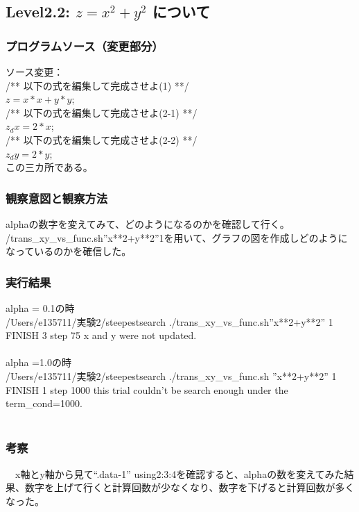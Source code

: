 \subsection{Level2.2: $z=x^2 + y^2$ について}
\subsubsection{プログラムソース（変更部分）}
ソース変更：\\
/** 以下の式を編集して完成させよ(1) **/\\
 $ z = x*x + y*y$;\\
/** 以下の式を編集して完成させよ(2-1) **/\\
$z_dx = 2*x$;\\
/** 以下の式を編集して完成させよ(2-2) **/\\
$z_dy = 2*y$;\\
この三カ所である。\\
\subsubsection{観察意図と観察方法}
alphaの数字を変えてみて、どのようになるのかを確認して行く。\\
/trans\_xy\_vs\_func.sh''x**2+y**2''1を用いて、グラフの図を作成しどのようになっているのかを確信した。\\
\subsubsection{実行結果}
alpha = 0.1の時\\
/Users/e135711/実験2/steepestsearch ./trans\_xy\_vs\_func.sh''x**2+y**2'' 1\\
FINISH 3 step 75 x and y were not updated.\\
\\
alpha =1.0の時\\
/Users/e135711/実験2/steepestsearch ./trans\_xy\_vs\_func.sh ''x**2+y**2'' 1\\
FINISH 1 step 1000 this trial couldn't be search enough under the term_cond=1000.\\
\\
\subsubsection{考察}
　x軸とy軸から見て“.data-1” using2:3:4を確認すると、alphaの数を変えてみた結果、数字を上げて行くと計算回数が少なくなり、数字を下げると計算回数が多くなった。\\
